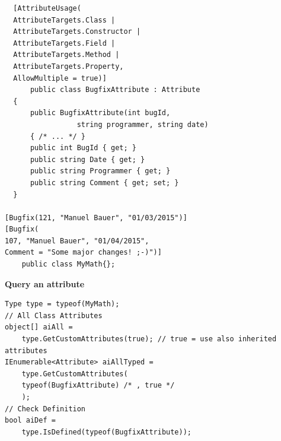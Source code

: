 \documentclass[11pt,twoside,landscape]{article}
\begin{document}
\begin{multicols}{3}
\lstset{language=csharp,label= ,caption= ,captionpos=b,numbers=none}
\begin{lstlisting}
  [AttributeUsage(
  AttributeTargets.Class |
  AttributeTargets.Constructor |
  AttributeTargets.Field |
  AttributeTargets.Method |
  AttributeTargets.Property,
  AllowMultiple = true)]
      public class BugfixAttribute : Attribute
  {
      public BugfixAttribute(int bugId,
			     string programmer, string date)
      { /* ... */ }
      public int BugId { get; }
      public string Date { get; }
      public string Programmer { get; }
      public string Comment { get; set; }
  }

[Bugfix(121, "Manuel Bauer", "01/03/2015")]
[Bugfix(
107, "Manuel Bauer", "01/04/2015",
Comment = "Some major changes! ;-)")]
    public class MyMath{};
\end{lstlisting}

\textbf{Query an attribute}

\lstset{language=csharp,label= ,caption= ,captionpos=b,numbers=none}
\begin{lstlisting}
Type type = typeof(MyMath);
// All Class Attributes
object[] aiAll =
    type.GetCustomAttributes(true); // true = use also inherited attributes
IEnumerable<Attribute> aiAllTyped =
    type.GetCustomAttributes(
	typeof(BugfixAttribute) /* , true */
    );
// Check Definition
bool aiDef =
    type.IsDefined(typeof(BugfixAttribute));
\end{lstlisting}
\end{multicols}
\end{document}
